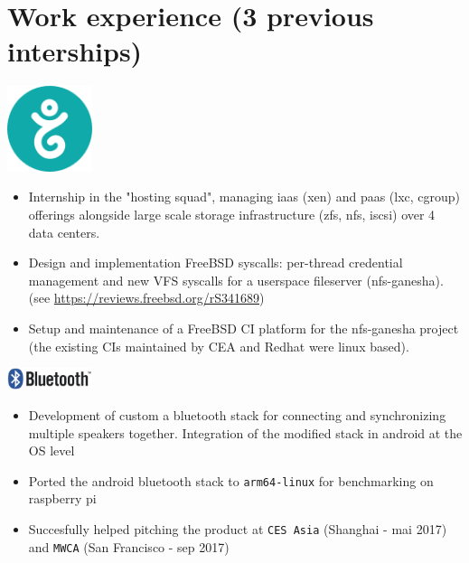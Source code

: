 \section{Work experience (3 previous interships)}

\noindent
\begin{minipage}{.15\textwidth}
    \centerline{\includegraphics[width=25mm]{img/gandi}}
\end{minipage}%
\hspace{5mm}
\begin{minipage}{.8\textwidth}
    \raggedright
    \begin{itemize}
	\item Internship in the "hosting squad", managing iaas (xen) and paas (lxc, cgroup) offerings alongside large scale storage infrastructure (zfs, nfs, iscsi) over 4 data centers.
	\item Design and implementation FreeBSD syscalls: per-thread credential management and new VFS syscalls for a userspace fileserver (nfs-ganesha).\newline (see \url{https://reviews.freebsd.org/rS341689})
	\item Setup and maintenance of a FreeBSD CI platform for the nfs-ganesha project (the existing CIs maintained by CEA and Redhat were linux based).
    \end{itemize}
\end{minipage}

\noindent
\begin{minipage}{.15\textwidth}
    \centerline{\includegraphics[width=25mm]{img/bluetooth}}
\end{minipage}%
\hspace{5mm}
\begin{minipage}{.8\textwidth}
    \raggedright
    \begin{itemize}
	\item Development of custom a bluetooth stack for connecting and synchronizing multiple speakers together. Integration of the modified stack in android at the OS level
	\item Ported the android bluetooth stack to \texttt{arm64-linux} for benchmarking on raspberry pi
	\item Succesfully helped pitching the product at \texttt{CES Asia} (Shanghai - mai 2017) and \texttt{MWCA} (San Francisco - sep 2017)
    \end{itemize}
\end{minipage}

